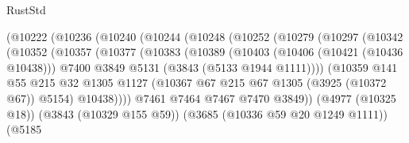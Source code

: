 \begin{lexlean}{RustStd}
\begin{coremodule}
                            (@10222
                              (@10236
                                (@10240
                                  (@10244
                                    (@10248
                                      (@10252
                                        (@10279
                                          (@10297
                                            (@10342
                                              (@10352
                                                (@10357
                                                  (@10377
                                                    (@10383
                                                      (@10389
                                                        (@10403
                                                          (@10406 (@10421 (@10436 @10438)))
                                                          @7400
                                                          @3849
                                                          @5131
                                                          (@3843 (@5133 @1944 @1111))))
                                                      (@10359
                                                        @141
                                                        @55
                                                        @215
                                                        @32
                                                        @1305
                                                        @1127
                                                        (@10367
                                                          @67
                                                          @215
                                                          @67
                                                          @1305
                                                          (@3925 (@10372 @67))
                                                          @5154)
                                                        @10438))))
                                                @7461
                                                @7464
                                                @7467
                                                @7470
                                                @3849))
                                            (@4977 (@10325 @18))
                                            (@3843 (@10329 @155 @59))
                                            (@3685 (@10336 @59 @20 @1249 @1111))
                                            (@5185

\end{coremodule}
\end{lexlean}
